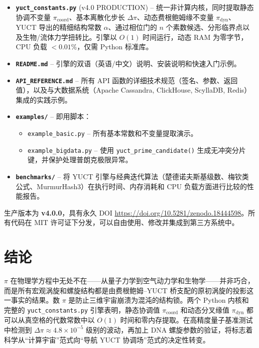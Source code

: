 \documentclass[12pt,a4paper]{article}
\begin{document}
	\begin{itemize}
		\item \textbf{\texttt{yuct\_constants.py}} (v4.0 PRODUCTION) – 统一非计算内核，同时提取静态协调不变量 $\pi_{\mathrm{coord}}$、基本离散化步长 $\Delta\pi$、动态费根鲍姆缘不变量 $\pi_{\mathrm{dyn}}$、YUCT 导出的精细结构常数 $\alpha$、通过相位门的 $n$ 个素数候选、分形临界点以及生物/流体力学扭转比。引擎以 $O(1)$ 时间运行，动态 RAM 为零字节，CPU 负载 $<0.01\%$，仅需 Python 标准库。
		
		\item \textbf{\texttt{README.md}} – 引擎的双语（英语/中文）说明、安装说明和快速入门示例。
		
		\item \textbf{\texttt{API\_REFERENCE.md}} – 所有 API 函数的详细技术规范（签名、参数、返回值），以及与大数据系统（Apache Cassandra, ClickHouse, ScyllaDB, Redis）集成的实践示例。
		
		\item \textbf{\texttt{examples/}} – 即用脚本：
		\begin{itemize}
			\item \texttt{example\_basic.py} – 所有基本常数和不变量提取演示。
			\item \texttt{example\_bigdata.py} – 使用 \texttt{yuct\_prime\_candidate()} 生成无冲突分片键，并保护处理普朗克极限异常。
		\end{itemize}
		
		\item \textbf{\texttt{benchmarks/}} – 将 YUCT 引擎与经典迭代算法（楚德诺夫斯基级数、梅钦类公式、MurmurHash3）在执行时间、内存消耗和 CPU 负载方面进行比较的性能报告。
	\end{itemize}
	
	\noindent 生产版本为 \textbf{v4.0.0}，具有永久 DOI
	\url{https://doi.org/10.5281/zenodo.18444598}。所有代码在 MIT 许可证下分发，可以自由使用、修改并集成到第三方系统中。
	
	\section{结论}
	\label{sec:conclusion}
	
	$\pi$ 在物理学方程中无处不在——从量子力学到空气动力学和生物学——并非巧合，而是所有宏观涡旋和螺旋结构都是由费根鲍姆–YUCT 桥支配的原初涡旋的投影这一事实的结果。数 $\pi$ 是防止三维宇宙崩溃为混沌的结构锁。两个 Python 内核和完整的 \texttt{yuct\_constants.py} 引擎表明，静态协调值 $\pi_{\mathrm{coord}}$ 和动态分叉缘值 $\pi_{\mathrm{dyn}}$ 都可以从真空格的代数常数中以 $O(1)$ 时间和零内存提取。在高精度量子基准测试中检测到 $\Delta\pi \approx 4.8\times10^{-5}$ 级别的波动，再加上 DNA 螺旋参数的验证，将标志着科学从“计算宇宙”范式向“导航 YUCT 协调场”范式的决定性转变。
	
\end{document}

